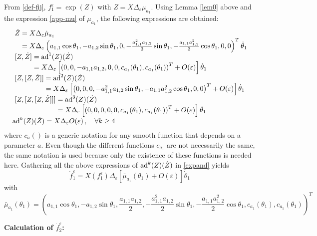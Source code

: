 \documentclass[a4paper,twoside]{article}
\def \ad {\textnormal{ad}}
\def \eps {\varepsilon}
\begin{document}
From \eqref{def-fij}, $f_1^\eps= \exp(Z)$ with $Z= X \Delta_\eps \mu_{a_1}$. 
Using Lemma \ref{lem0} above and the expression \eqref{app-mu} of $\mu_{a_1}$, 
the following expressions are obtained:
\[
\begin{array}{l}
~\dot Z =  X \Delta_\eps \dot \mu_{a_1} \\
 \phantom{~\dot Z } =  X \Delta_\eps  \left( a_{1,1} \cos \theta_1, -a_{1,2} \sin \theta_1,0,
- \frac{a_{1,1}^2 a_{1,2}}{3} \sin \theta_1, - \frac{a_{1,1}a_{1,2}^2}{3} \cos \theta_1,0,0 \right)^T \dot \theta_1 \\
~[Z,\dot Z]  =  \ad^1(Z)(\dot Z) \\
\phantom{~[Z, \dot Z] }   = X \Delta_\eps \left[ \left(0,0,-a_{1,1}a_{1,2},0,0, c_{a_1}(\theta_1),c_{a_1}(\theta_1) 
\right)^T +O(\eps) \right] \dot \theta_1 \\
~[Z,[Z,\dot Z]]   =  \ad^2(Z)(\dot Z) \\
\phantom{~[Z,[Z,\dot Z]]}   = X \Delta_\eps \left[\left(0,0,0,-a_{1,1}^2 a_{1,2} \sin \theta_1,-a_{1,1}a_{1,2}^2 
\cos \theta_1,0,0\right)^T+ O(\eps) \right] \dot \theta_1 \\
~[Z,[Z,[Z,\dot Z]]]  =  \ad^3(Z)(\dot Z) \\
\phantom{~[Z,[Z,[Z,\dot Z]]]}   =  X \Delta_\eps \left[\left(0,0,0,0,0,c_{a_1}(\theta_1), c_{a_1}(\theta_1)\right)^T 
+ O(\eps) \right] 
\dot \theta_1 \\
\ad^k(Z) (\dot Z)= X \Delta_\eps O(\eps) \, , \quad \forall k \geq 4
\end{array}
\]
where $c_{a}()$ is a generic notation for any smooth function that depends on a parameter $a$. 
Even though the different functions $c_{a_1}$ are not necessarily the same, the same notation is 
used because only the existence of these functions
is needed here. Gathering all the above expressions of $\ad^k(Z) (\dot Z)$ in \eqref{expand} yields
\begin{equation}
\label{df2}
\dot f_1^\eps= X(f_1^\eps) \Delta_\eps [\bar \mu_{a_1}(\theta_1)+O(\eps)] \dot \theta_1
\end{equation}
with
\begin{equation}
\label{defmu2}
\bar \mu_{a_1}(\theta_1)=
\left(a_{1,1} \cos \theta_1, -a_{1,2} \sin \theta_1,\frac{a_{1,1}a_{1,2}}{2}, -\frac{a_{1,1}^2a_{1,2}}{2} \sin \theta_1, 
- \frac{a_{1,1}a_{1,2}^2}{2} \cos \theta_1, c_{a_1}(\theta_1),c_{a_1}(\theta_1) \right)^T
\end{equation}
\vspace*{.2cm}

\noindent \textbf{Calculation of $\dot f_2^\eps$:} 
\end{document}
